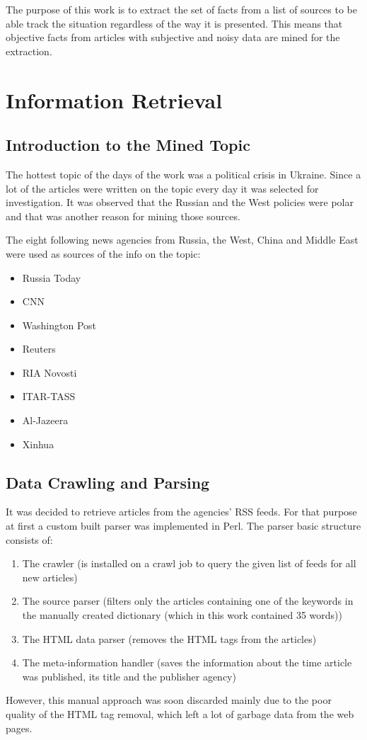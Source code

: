 \documentclass[]{article}
\begin{document}
The purpose of this work is to extract the set of facts from a list of sources to be able track the situation regardless of the way it is presented. This means that objective facts from articles with subjective and noisy data are mined for the extraction.
%
\section{Information Retrieval}
%
%
\subsection{Introduction to the Mined Topic}
%
The hottest topic of the days of the work was a political crisis in Ukraine. Since a lot of the articles were written on the topic every day it was selected for investigation. It was observed that the Russian and the West policies were polar and that was another reason for mining those sources.

The eight following news agencies from Russia, the West, China and Middle East were used as sources of the info on the topic:
\begin{multicols}{2}
	\begin{itemize}
		\itemsep 0em
		\item Russia Today 
		\item CNN
		\item Washington Post
		\item Reuters
		\item RIA Novosti
		\item ITAR-TASS
		\item Al-Jazeera
		\item Xinhua
	\end{itemize}
\end{multicols}
%
\subsection{Data Crawling and Parsing}
%
It was decided to retrieve articles from the agencies' RSS feeds. For that purpose at first a custom built parser was implemented in Perl. The parser basic structure consists of: 
\begin{enumerate}
	\item The crawler (is installed on a crawl job to query the given list of feeds for all new articles)
	\item The source parser (filters only the articles containing one of the keywords in the manually created dictionary (which in this work contained 35 words))
	\item The HTML data parser (removes the HTML tags from the articles)
	\item The meta-information handler (saves the information about the time article was published, its title and the publisher agency)
\end{enumerate}
However, this manual approach was soon discarded mainly due to the poor quality of the HTML tag removal, which left a lot of garbage data from the web pages. 
\end{document}
